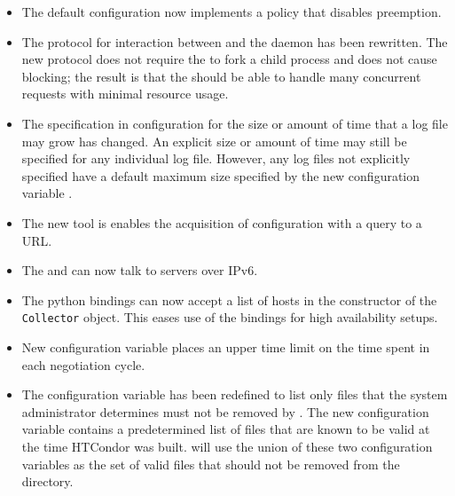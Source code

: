 \begin{itemize}

\item The default configuration now implements a policy 
that disables preemption.

\item The protocol for interaction between  and the 
 daemon has been rewritten.
The new protocol does not require the  to fork a child process 
and does not cause blocking; 
the result is that the  should be able to handle
many concurrent  requests with minimal resource usage.

\item The specification in configuration for the size or amount of time
that a log file may grow has changed.
An explicit size or amount of time may still be specified for any
individual log file.
However, any log files not explicitly specified have a default maximum
size specified by the new configuration variable 
.

\item The new  tool is enables the  acquisition of
configuration with a query to a URL.

\item The  and  can now talk to
servers over IPv6.

\item The python bindings can now accept a list of  hosts
in the constructor of the \texttt{Collector} object.  
This eases use of the bindings for high availability setups.

\item New configuration variable 
places an upper time limit on the time spent in each negotiation cycle.

\item The configuration variable  has been redefined
to list only files that the system administrator determines must not
be removed by .
The new configuration variable  contains 
a predetermined list of files that are known to be valid at 
the time HTCondor was built. 
 will use the union of these two configuration variables 
as the set of valid files that should not be removed from the 
directory.


\end{itemize}
